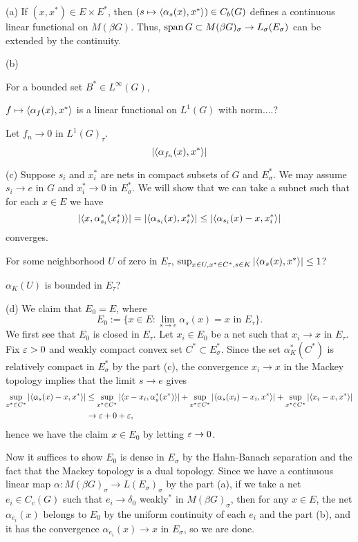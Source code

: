 \documentclass{../../large}
\begin{document}
\begin{pf}


(a)
If $(x,x^*)\in E\times E^*$, then $(s\mapsto\langle\alpha_s(x),x^*\rangle)\in C_b(G)$ defines a continuous linear functional on $M(\beta G)$.
Thus, $\operatorname{span} G\subset M(\beta G)_\sigma\to L_\sigma(E_\sigma)$ can be extended by the continuity. 


(b)

For a bounded set $B^*\in L^\infty(G)$,


$f\mapsto\langle\alpha_f(x),x^*\rangle$ is a linear functional on $L^1(G)$ with norm....?

Let $f_n\to0$ in $L^1(G)_\tau$.
\[|\langle\alpha_{f_n}(x),x^*\rangle|\]

(c)
Suppose $s_i$ and $x_i^*$ are nets in compact subsets of $G$ and $E^*_\sigma$.
We may assume $s_i\to e$ in $G$ and $x_i^*\to0$ in $E^*_\sigma$.
We will show that we can take a subnet such that for each $x\in E$ we have
\[|\langle x,\alpha^*_{s_i}(x_i^*)\rangle|=|\langle\alpha_{s_i}(x),x_i^*\rangle|\le|\langle\alpha_{s_i}(x)-x,x_i^*\rangle|\]
converges.


For some neighborhood $U$ of zero in $E_\tau$,
$\sup_{x\in U,x^*\in C^*,s\in K}|\langle\alpha_s(x),x^*\rangle|\le1$?

$\alpha_K(U)$ is bounded in $E_\tau$?




(d)
We claim that $E_0=E$, where
\[E_0:=\{x\in E:\lim_{s\to e}\alpha_s(x)=x\text{ in }E_\tau\}.\]
We first see that $E_0$ is closed in $E_\tau$.
Let $x_i\in E_0$ be a net such that $x_i\to x$ in $E_\tau$.
Fix $\varepsilon>0$ and weakly compact convex set $C^*\subset E^*_\sigma$.
Since the set $\alpha_K^*(C^*)$ is relatively compact in $E^*_\sigma$ by the part (c), the convergence $x_i\to x$ in the Mackey topology implies that the limit $s\to e$ gives
\begin{align*}
\sup_{x^*\in C^*}|\langle\alpha_s(x)-x,x^*\rangle|
&\le\sup_{x^*\in C^*}|\langle x-x_i,\alpha_s^*(x^*)\rangle|+\sup_{x^*\in C^*}|\langle\alpha_s(x_i)-x_i,x^*\rangle|+\sup_{x^*\in C^*}|\langle x_i-x,x^*\rangle|\\
&\to\varepsilon+0+\varepsilon,
\end{align*}
hence we have the claim $x\in E_0$ by letting $\varepsilon\to0$.

Now it suffices to show $E_0$ is dense in $E_\sigma$ by the Hahn-Banach separation and the fact that the Mackey topology is a dual topology.
Since we have a continuous linear map $\alpha:M(\beta G)_\sigma\to L(E_\sigma)_\sigma$ by the part (a), if we take a net $e_i\in C_c(G)$ such that $e_i\to\delta_0$ weakly$^*$ in $M(\beta G)_\sigma$, then for any $x\in E$, the net $\alpha_{e_i}(x)$ belongs to $E_0$ by the uniform continuity of each $e_i$ and the part (b), and it has the convergence $\alpha_{e_i}(x)\to x$ in $E_\sigma$, so we are done.



\end{pf}
\end{document}
